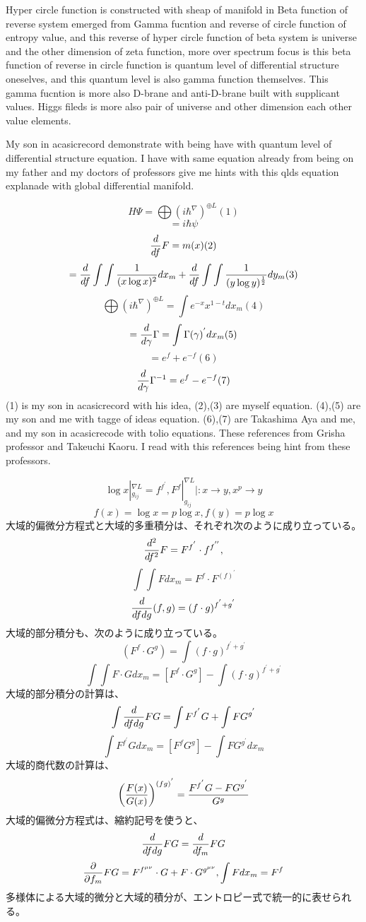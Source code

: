 \documentclass{jsarticle}
\begin{document}
    Hyper circle function is constructed with sheap of manifold in 
    Beta function of reverse system emerged from Gamma fucntion 
    and reverse of circle function of entropy value,
    and this reverse of hyper circle function of beta system
    is universe and the other dimension of zeta function,
    more over spectrum focus is this beta function of reverse in
    circle function is quantum level of differential structure oneselves,
    and this quantum level is also gamma function themselves.
    This gamma fucntion is more also D-brane and anti-D-brane built 
    with supplicant values. Higgs fileds is more also pair of universe and
    other dimension each other value elements. 


    My son in acasicrecord demonstrate with being have with quantum level
    of differential structure equation.
    I have with same equation already from being on 
    my father and my doctors of professors give me hints with 
    this qlds equation explanade with global differential manifold.

    $$ H\Psi = \bigoplus {(i \hbar^{\nabla})}^{\oplus L}  (1)$$
    $$ = i\hbar\psi $$
    $$ {d \over df}F = m(x) (2) $$
    $$ = {d \over df}\int \int{1 \over (x \log x)^2}dx_m
    + {d \over df}\int \int{1 \over (y \log y)^{1 \over 2}}dy_m  (3)$$
    $$  \bigoplus {(i \hbar^{\nabla})}^{\oplus L} = \int e^{-x}x^{1 - t}dx_m 
    (4)$$
    $$ = {d \over d \gamma}\Gamma = \int \Gamma(\gamma)^{'}dx_m (5)$$
    $$ = e^f + e^{-f} (6)$$
    $$ {d \over d \gamma}\Gamma^{-1} = e^{f} - e^{-f} (7)$$
    (1) is my son in acasicrecord with his idea, (2),(3) are myself equation.
    (4),(5) are my son and me with tagge of ideas equation.
    (6),(7) are Takashima Aya and me, and my son in acasicrecode with tolio
    equations.
    These references from Grisha professor and Takeuchi Kaoru.
    I read with this references being hint from these professors.
 
  $$ \log x|_{g_{ij}}^{\nabla L} = f^{f^{'}}, F^f|_{g_{ij}}^{\nabla L}
  |: x \to y, x^p \to y $$ 
  $$  f(x) = \log x = p \log x, f(y) = p \log x  $$
  大域的偏微分方程式と大域的多重積分は、それぞれ次のように成り立っている。
  $$ {d^2 \over df^2}F = F^{f^{'}}\cdot f^{f^{''}},  $$
  $$ \int \int F dx_m = F^f \cdot F^{(f)^{'}} $$
  $$ {d \over df dg}(f,g) = (f \cdot g)^{f^{'} + g^{'}} $$
  大域的部分積分も、次のように成り立っている。
  $$ (F^f \cdot G^g) = \int (f \cdot g)^{f^{'} + g^{'}} $$
  $$ \int \int F\cdot G dx_m = [F^f \cdot G^g] - 
  \int (f \cdot g)^{f^{'} + g^{'}} $$
  大域的部分積分の計算は、
  $$ \int {d \over {df dg}}FG = \int F^{f^{'}}G + \int F G^{g^{'}} $$
  $$ \int F^{f^{'}}Gdx_m = [F^f G^g] - \int F G^{g^{'}}dx_m$$
  大域的商代数の計算は、
  $$ \left({F(x) \over G(x)}\right)^{(fg)^{'}} = {F^{f^{'}}G - FG^{g^{'}}
  \over G^{g}} $$
  大域的偏微分方程式は、縮約記号を使うと、
  $$ {d \over df dg}FG = {d \over df_m}FG $$
  $$ {\partial \over \partial f_m}FG = F^{f^{\mu\nu}}\cdot G
  + F \cdot G^{g^{\mu\nu}}, \int F dx_m = F^f $$
  多様体による大域的微分と大域的積分が、エントロピー式で統一的に表せられる。
\end{document}
